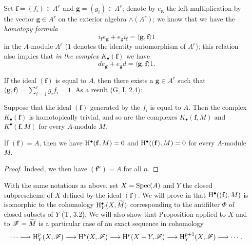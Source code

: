 \begin{env}[1.1.7]
\label{III.1.1.7}
Set $\mathbf{f}=(f_i)\in A^r$ and $\mathbf{g}=(g_i)\in A^r$; denote by $e_\mathbf{g}$ the left multiplication by the vector $\mathbf{g}\in A^r$ on the exterior algebra $\wedge(A^r)$; we know that we have the \emph{homotopy formula}
\[
  i_\mathbf{f}e_\mathbf{g}+e_\mathbf{g}i_\mathbf{f}=\langle\mathbf{g},\mathbf{f}\rangle 1
  \tag{1.1.7.1}
\]
in the $A$-module $A^r$ ($1$ denotes the identity automorphism of $A^r$); this relation also implies that \emph{in the complex $K_\bullet(\mathbf{f})$} we have
\[
  de_\mathbf{g}+e_\mathbf{g}d=\langle\mathbf{g},\mathbf{f}\rangle 1.
  \tag{1.1.7.2}
\]

If the ideal $(\mathbf{f})$ is equal to $A$, then there exists a $\mathbf{g}\in A^r$ such that $\langle\mathbf{g},\mathbf{f}\rangle=\sum_{i=1}^r g_i f_i=1$.
As a result (G, I, 2.4):
\end{env}

\begin{proposition}[1.1.8]
\label{III.1.1.8}
Suppose that the ideal $(\mathbf{f})$ generated by the $f_i$ is equal to $A$.
Then the complex $K_\bullet(\mathbf{f})$ is homotopically trivial, and so are the complexes $K_\bullet(\mathbf{f},M)$ and $K^\bullet(\mathbf{f},M)$ for every $A$-module $M$.
\end{proposition}

\begin{corollary}[1.1.9]
\label{III.1.1.9}
If $(\mathbf{f})=A$, then we have $\mathrm{H}^\bullet(\mathbf{f},M)=0$ and $\mathrm{H}^\bullet((\mathbf{f}),M)=0$ for every $A$-module $M$.
\end{corollary}

\begin{proof}
Indeed, we then have $(\mathbf{f}^n)=A$ for all $n$.
\end{proof}

\begin{remark}[1.1.10]
\label{III.1.1.10}
With the same notations as above, set $X=\operatorname{Spec}(A)$ and $Y$ the closed subprescheme of $X$ defined by the ideal $(\mathbf{f})$.
We will prove in  that $\mathrm{H}^\bullet((\mathbf{f}),M)$ is isomorphic to the cohomology $\mathrm{H}_Y^\bullet(X,\widetilde{M})$ corresponding to the antifilter $\Phi$ of closed subsets of $Y$ (T, 3.2).
We will also show that Proposition  applied to $X$ and to $\mathscr{F}=\widetilde{M}$ is a particular case of an exact sequence in cohomology
\[
  \cdots\to\HH_Y^p(X,\sh{F})\to\HH^p(X,\sh{F})\to\HH^p(X\setmin Y,\sh{F})\to\HH_Y^{p+1}(X,\sh{F})\to\cdots.
\]
\end{remark}

